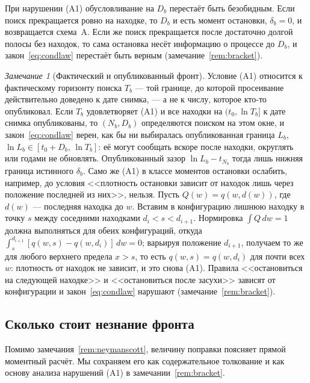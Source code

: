 \documentclass[11pt,a4paper]{article}
\theoremstyle{plain}
\theoremstyle{remark}
\newtheorem{remark}{Замечание}
\begin{document}
\noindent При нарушении (A1) обусловливание на $D_b$ перестаёт быть безобидным.
Если поиск прекращается ровно на находке, то $D_b$ и есть момент остановки,
$\delta_b=0$, и возвращается схема~A. Если же поиск прекращается после
достаточно долгой полосы без находок, то сама остановка несёт информацию о
процессе до $D_b$, и закон~\eqref{eq:condlaw} перестаёт быть верным
(замечание~\ref{rem:bracket}).

\begin{remark}[Фактический и опубликованный фронт]\label{rem:weaker}
Условие (A1) относится к фактическому горизонту поиска $T_b$ --- той границе, до
которой просеивание действительно доведено к дате снимка, --- а не к числу, которое
кто-то опубликовал. Если $T_b$ удовлетворяет (A1) и все находки на
$(t_0,\ln T_b]$ к дате снимка опубликованы, то $(N_b,D_b)$ определяются поиском на
этом окне, и закон~\eqref{eq:condlaw} верен, как бы ни выбиралась опубликованная
граница $L_b$, $\ln L_b\in[t_0+D_b,\,\ln T_b]$: её могут сообщать вскоре после находки,
округлять или годами не обновлять. Опубликованный зазор $\ln L_b-t_{N_b}$ тогда лишь
нижняя граница истинного $\delta_b$. Само же (A1) в классе моментов остановки
ослабить, например, до условия <<плотность остановки зависит от находок лишь через
положение последней из них>>, нельзя. Пусть $Q(w)=q(w,d(w))$, где $d(w)$ ---
последняя находка до $w$. Вставим в конфигурацию лишнюю находку в точку $s$ между
соседними находками $d_i<s<d_{i+1}$. Нормировка $\int Q\,dw=1$ должна выполняться
для обеих конфигураций, откуда $\int_s^{d_{i+1}}[q(w,s)-q(w,d_i)]\,dw=0$; варьируя
положение $d_{i+1}$, получаем то же для любого верхнего предела $x>s$, то есть
$q(w,s)=q(w,d_i)$ для почти всех $w$: плотность от находок не зависит, и это
снова (A1). Правила <<остановиться на следующей находке>> и <<остановиться после
засухи>> зависят от конфигурации и закон~\eqref{eq:condlaw} нарушают
(замечание~\ref{rem:bracket}).
\end{remark}

\subsection{Сколько стоит незнание фронта}\label{sec:cost}

Помимо замечания~\ref{rem:neymanscott}, величину поправки поясняет прямой
моментный расчёт. Мы сохраняем его как содержательное толкование и как основу
анализа нарушений (A1) в замечании~\ref{rem:bracket}.
\end{document}
